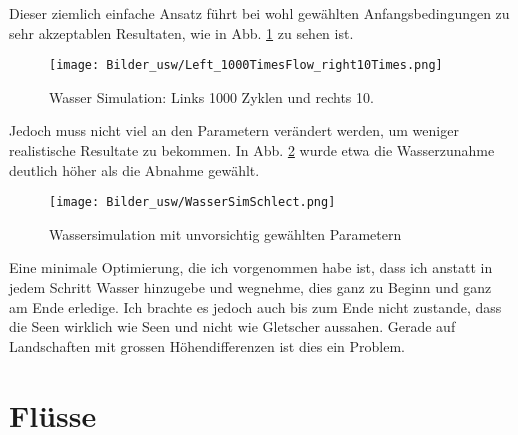 \documentclass[12pt,twoside]{book}
\begin{document}
Dieser ziemlich einfache Ansatz f\"uhrt bei wohl gew\"ahlten Anfangsbedingungen zu sehr akzeptablen Resultaten, wie in Abb. \ref{fig:WaterSim} zu sehen ist.
\begin{figure}[H]
\centering
\texttt{[image: Bilder\_usw/Left\_1000TimesFlow\_right10Times.png]}
\centering
 \caption{Wasser Simulation: Links 1000 Zyklen und rechts 10.}
 \centering
  \label{fig:WaterSim}
\centering
\end{figure}

Jedoch muss nicht viel an den Parametern ver\"andert werden, um weniger realistische Resultate zu bekommen. In Abb. \ref{fig:WaterSimSchlecht} wurde etwa die Wasserzunahme deutlich h\"oher als die Abnahme gew\"ahlt.
\begin{figure}[H]
\centering
\texttt{[image: Bilder\_usw/WasserSimSchlect.png]}
 \caption{Wassersimulation mit unvorsichtig gew\"ahlten Parametern}
  \label{fig:WaterSimSchlecht}
\centering
\end{figure}

Eine minimale Optimierung, die ich vorgenommen habe ist, dass ich anstatt in jedem Schritt Wasser hinzugebe und wegnehme, dies ganz zu Beginn und ganz am Ende erledige.
Ich brachte es jedoch auch bis zum Ende nicht zustande, dass die Seen wirklich wie Seen und nicht wie Gletscher aussahen. Gerade auf Landschaften mit grossen H\"ohendifferenzen ist dies ein Problem.

\section{Fl\"usse}
\end{document}
